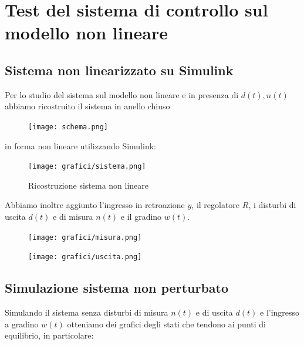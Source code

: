 \documentclass{article}
\begin{document}
\pagebreak


\section{Test del sistema di controllo sul modello non lineare}

\subsection{Sistema non linearizzato su Simulink}
Per lo studio del sistema sul modello non lineare e in presenza di $d(t),n(t)$ abbiamo ricostruito il sistema in anello chiuso

\begin{figure}[!h]
\centering
\texttt{[image: schema.png]}
\end{figure}

in forma non lineare utilizzando Simulink:

\begin{figure}[!h]
\centering
\texttt{[image: grafici/sistema.png]}
\caption{\label{fig:orbit}Ricostruzione sistema non lineare}
\end{figure}
\pagebreak
\noindent
Abbiamo inoltre aggiunto l'ingresso in retroazione $y$, il regolatore $R$, i disturbi di uscita $d(t)$ e di misura $n(t)$ e il gradino $w(t)$.
\begin{figure}[!h]
   \begin{minipage}{0.60\textwidth}
     \centering
     \texttt{[image: grafici/misura.png]}
   \end{minipage}\hfill
   \begin{minipage}{0.45\textwidth}
     \centering
     \texttt{[image: grafici/uscita.png]}
   \end{minipage}
\end{figure}

\newpage 
\subsection{Simulazione sistema non perturbato}

Simulando il sistema senza disturbi di misura $n(t)$ e di uscita $d(t)$ e l'ingresso a gradino $w(t)$ otteniamo dei grafici degli stati che tendono ai punti di equilibrio, in particolare:
\\
\end{document}
